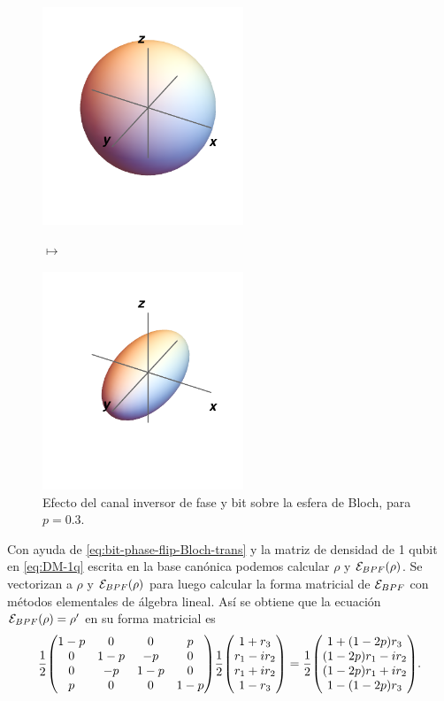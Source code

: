 \begin{figure}
\centering
\begin{minipage}{.4\textwidth}
    \centering
    \includegraphics[width=6cm]{images/bloch-ball}
\end{minipage}
$\longmapsto$
\begin{minipage}{0.4\textwidth}
    \centering
    \includegraphics[width=6cm]{images/bit-phase-flip}
\end{minipage}
\caption{
Efecto del canal inversor de fase y bit sobre la esfera de Bloch, 
para $p=0.3$.}
\label{fig:bit-phase-flip}
\end{figure}
Con ayuda de \eqref{eq:bit-phase-flip-Bloch-trans} y la matriz
de densidad de 1 qubit en \eqref{eq:DM-1q} 
escrita en la base canónica podemos calcular 
$\rho$ y $\mathcal{E}_{BPF}\qty(\rho)$. Se vectorizan a $\rho$ y 
$\mathcal{E}_{BPF}\qty(\rho)$ para luego calcular la forma matricial 
de $\mathcal{E}_{BPF}$ con métodos elementales de álgebra lineal.
Así se obtiene que la ecuación $\mathcal{E}_{BPF}(\rho)=\rho'$ 
en su forma matricial es
\begin{align}
\frac{1}{2}
\mqty(
1-p & 0 & 0 & p \\
0 & 1-p & -p & 0 \\
0 & -p & 1-p & 0 \\
p & 0 & 0 & 1-p \\
)
\frac{1}{2}
\mqty(
1+r_3\\r_1-ir_2\\r_1+ir_2\\1-r_3
)
=
\frac{1}{2}
\mqty(
1+\qty(1-2p)r_3\\
\qty(1-2p)r_1-i r_2\\
\qty(1-2p)r_1+i r_2\\
1-\qty(1-2p)r_3
).
\label{eq:bpf-supero}
\end{align}
